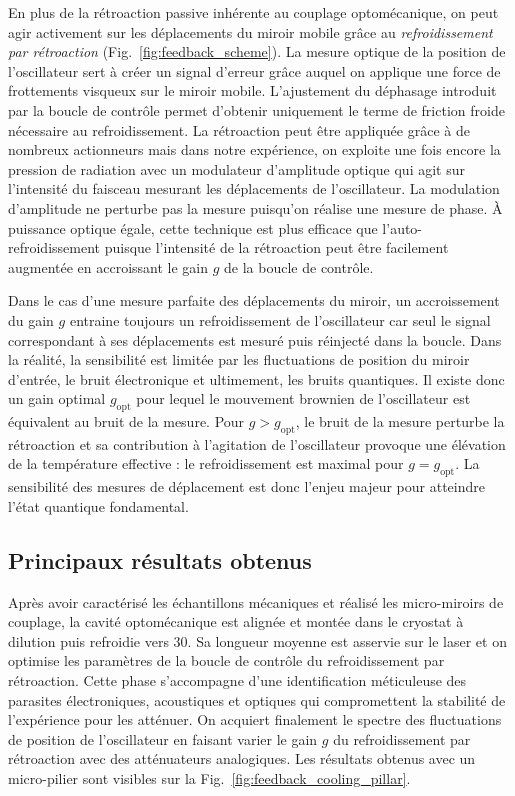 \documentclass[12pt,a4paper]{article}
\begin{document}
En plus de la rétroaction passive inhérente au couplage optomécanique, on peut agir activement sur les déplacements du miroir mobile grâce au \emph{refroidissement par rétroaction} (Fig.~\ref{fig:feedback_scheme}).
La mesure optique de la position de l'oscillateur sert à créer un signal d'erreur grâce auquel on applique une force de frottements visqueux sur le miroir mobile.
L'ajustement du déphasage introduit par la boucle de contrôle permet d'obtenir uniquement le terme de friction froide nécessaire au refroidissement.
La rétroaction peut être appliquée grâce à de nombreux actionneurs mais dans notre expérience, on exploite une fois encore la pression de radiation avec un modulateur d'amplitude optique qui agit sur l'intensité du faisceau mesurant les déplacements de l'oscillateur.
La modulation d'amplitude ne perturbe pas la mesure puisqu'on réalise une mesure de phase. 
À puissance optique égale, cette technique est plus efficace que l'auto-refroidissement puisque l'intensité de la rétroaction peut être facilement augmentée en accroissant le gain $g$ de la boucle de contrôle.

Dans le cas d'une mesure parfaite des déplacements du miroir, un accroissement du gain $g$ entraine toujours un refroidissement de l'oscillateur car seul le signal correspondant à ses déplacements est mesuré puis réinjecté dans la boucle.
Dans la réalité, la sensibilité est limitée par les fluctuations de position du miroir d'entrée, le bruit électronique et ultimement, les bruits quantiques.
Il existe donc un gain optimal $g_\mathrm{opt}$ pour lequel le mouvement brownien de l'oscillateur est équivalent au bruit de la mesure.
Pour $g>g_\mathrm{opt}$, le bruit de la mesure perturbe la rétroaction et sa contribution à l'agitation de l'oscillateur provoque une élévation de la température effective : le refroidissement est maximal pour $g=g_\mathrm{opt}$.
La sensibilité des mesures de déplacement est donc l'enjeu majeur pour atteindre l'état quantique fondamental.

\subsection{Principaux résultats obtenus}
\label{sec:results}

Après avoir caractérisé les échantillons mécaniques et réalisé les micro-miroirs de couplage, la cavité optomécanique est alignée et montée dans le cryostat à dilution puis refroidie vers \unit{30}{\milli\kelvin}.
Sa longueur moyenne est asservie sur le laser et on optimise les paramètres de la boucle de contrôle du refroidissement par rétroaction.
Cette phase s'accompagne d'une identification méticuleuse des parasites électroniques, acoustiques et optiques qui compromettent la stabilité de l'expérience pour les atténuer.
On acquiert finalement le spectre des fluctuations de position de l'oscillateur en faisant varier le gain $g$ du refroidissement par rétroaction avec des atténuateurs analogiques.
Les résultats obtenus avec un micro-pilier sont visibles sur la Fig.~\ref{fig:feedback_cooling_pillar}.
\end{document}
